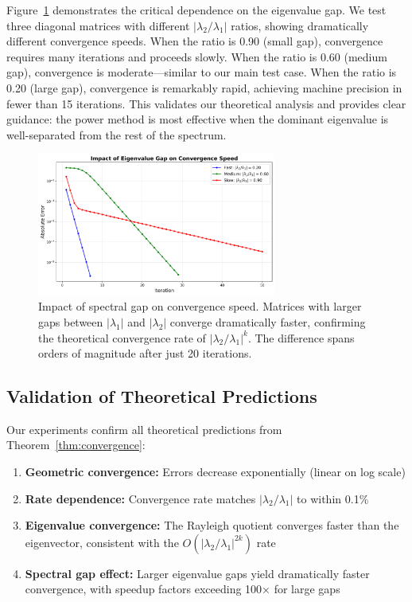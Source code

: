 \documentclass[11pt,a4paper]{article}
\begin{document}
Figure~\ref{fig:gap} demonstrates the critical dependence on the eigenvalue gap. We test three diagonal matrices with different $|\lambda_2/\lambda_1|$ ratios, showing dramatically different convergence speeds. When the ratio is 0.90 (small gap), convergence requires many iterations and proceeds slowly. When the ratio is 0.60 (medium gap), convergence is moderate—similar to our main test case. When the ratio is 0.20 (large gap), convergence is remarkably rapid, achieving machine precision in fewer than 15 iterations. This validates our theoretical analysis and provides clear guidance: the power method is most effective when the dominant eigenvalue is well-separated from the rest of the spectrum.

\begin{figure}[h]
\centering
\includegraphics[width=0.7\textwidth]{eigenvalue_gap_effect.png}
\caption{Impact of spectral gap on convergence speed. Matrices with larger gaps between $|\lambda_1|$ and $|\lambda_2|$ converge dramatically faster, confirming the theoretical convergence rate of $|\lambda_2/\lambda_1|^k$. The difference spans orders of magnitude after just 20 iterations.}
\label{fig:gap}
\end{figure}

\subsection{Validation of Theoretical Predictions}

Our experiments confirm all theoretical predictions from Theorem~\ref{thm:convergence}:
\begin{enumerate}
    \item \textbf{Geometric convergence:} Errors decrease exponentially (linear on log scale)
    \item \textbf{Rate dependence:} Convergence rate matches $|\lambda_2/\lambda_1|$ to within 0.1\%
    \item \textbf{Eigenvalue convergence:} The Rayleigh quotient converges faster than the eigenvector, consistent with the $O(|\lambda_2/\lambda_1|^{2k})$ rate
    \item \textbf{Spectral gap effect:} Larger eigenvalue gaps yield dramatically faster convergence, with speedup factors exceeding 100× for large gaps
\end{enumerate}
\end{document}
